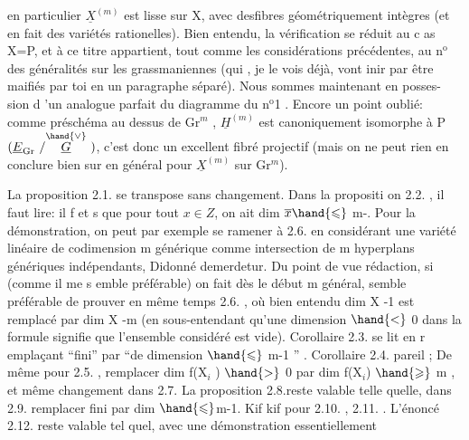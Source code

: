 
en particulier $\underline{X}^{(m)}$ est lisse sur X, avec des\hand{/}fibres géométriquement
intègres (et en fait des variétés rationelles). Bien entendu, la
vérification se réduit au c as X=P, et à ce titre appartient, tout
\margin{|}comme les considérations précédentes, au n$^{\text{o}}$ des généralités sur les
grassmaniennes (qui , je le vois déjà, vont inir par être maifiés
par toi en un paragraphe séparé). Nous sommes maintenant en posses-%
sion d 'un analogue parfait du diagramme du n$^{\text{o}}$1 . Encore un point
oublié: comme préschéma au dessus de Gr$^{m}$ , $\underline{H}^{(m)}$ est canoniquement
isomorphe à P$(\underline{E}_{\mathrm{Gr}}\ /\overset{\hand{\vee}}{\underline{G}}\ )$, c'est donc un excellent fibré projectif
(mais on ne peut rien en conclure bien sur en général pour $\underline{X}^{(m)}$ sur
Gr$^{m}$).

La proposition 2.1. se transpose sans changement. Dans la
propositi on 2.2. , il faut lire: il f et s que pour tout $x \in Z$, on
ait  dim $\overline{x} \hand{\leqslant}$ m-. Pour la démonstration, on peut par exemple
se ramener à 2.6. en considérant une  variété linéaire de
codimension m générique comme intersection de m hyperplans génériques
indépendants, Didonné demerdetur. Du point de vue rédaction, si
(comme il me s emble préférable) on fait dès le début m général, 
semble préférable de prouver en même temps 2.6. , où bien entendu
dim X -1 est remplacé par dim X -m (en sous-entendant qu'une dimension
$\hand{<}$ 0 dans la formule signifie que l'ensemble considéré est vide).
Corollaire 2.3. se lit en r emplaçant ``fini'' par ``de dimension $\hand{\leqslant}$ 
m-1 '' . Corollaire 2.4. pareil ; De même pour 2.5. , remplacer
dim f(X$_{i}$ ) $\hand{>}$ 0 par dim f(X$_{i}$) $\hand{\geqslant}$ m , et même changement dans 2.7.
La proposition 2.8.reste valable telle quelle, dans 2.9. remplacer
fini par dim $\hand{\leqslant}$m-1. Kif kif pour 2.10. , 2.11. . L'énoncé
2.12. reste valable tel quel, avec une démonstration essentiellement

